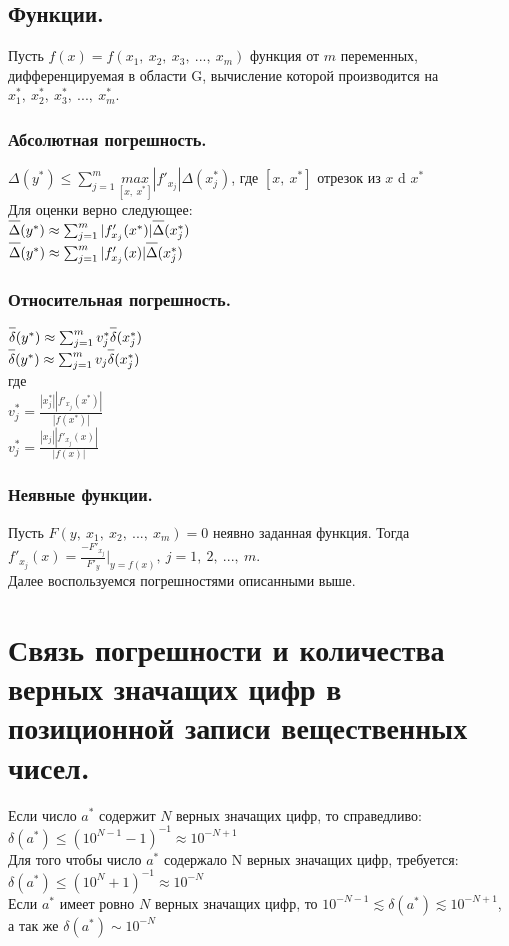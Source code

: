 \documentclass[16pt]{article}
\begin{document}
			\subsection {Функции.}
				Пусть $f(x) = f(x_1,\ x_2,\ x_3,\ ...,\ x_m)$ функция от $m$ переменных, дифференцируемая в области G, вычисление которой производится на $x^{*}_1,\ x^{*}_2,\ x^{*}_3,\ ...,\ x^{*}_m$.\\
				\subsubsection{Абсолютная погрешность.}
				$\Delta(y^{*}) \leq \sum_{j=1}^{m} \underset{[x,\ x^{*}]}{max}|f'_{x_j}|\Delta(x^{*}_j)$, где $[x,\ x^{*}]$ отрезок из $x$ d $x^{*}$\\
				Для оценки верно следующее:\\
				$\overline{\raisebox{3mm}{} \Delta}(y^{*})\approx \sum_{j=1}^{m} |f'_{x_j}(x^{*})|\overline{\raisebox{3mm}{} \Delta}(x^{*}_j)$\\
				$\overline{\raisebox{3mm}{} \Delta}(y^{*})\approx \sum_{j=1}^{m} |f'_{x_j}(x)|\overline{\raisebox{3mm}{} \Delta}(x^{*}_j)$\\
				\subsubsection{Относительная погрешность.}
				$\overline{\raisebox{3mm}{} \delta}(y^{*}) \approx \sum_{j=1}^{m} v^{*}_j \overline{\raisebox{3mm}{} \delta}(x^{*}_j)$\\
				$\overline{\raisebox{3mm}{} \delta}(y^{*}) \approx \sum_{j=1}^{m} v_j \overline{\raisebox{3mm}{} \delta}(x^{*}_j)$\\
				где\\
				$v^{*}_j = \frac{|x^{*}_j||f'_{x_j}(x^{*})|}{|f(x^{*})|}$\\
				$v^{*}_j = \frac{|x_j||f'_{x_j}(x)|}{|f(x)|}$\\
				\subsubsection{Неявные функции.}
				Пусть $F(y,\ x_1,\ x_2,\ ...,\ x_m) = 0 $ неявно заданная функция. Тогда $f'_{x_j}(x) = \frac{-F'_{x_j}}{F'_y}|_{y=f(x)},\ j=1,\ 2,\ ...,\ m.$\\
				Далее воспользуемся погрешностями описанными выше.\\ 
		\section {Связь погрешности и количества верных значащих цифр в позиционной записи вещественных чисел.}
			Если число $a^{*}$ содержит $N$ верных значащих цифр, то справедливо:\\
			$\delta(a^{*}) \leq (10^{N-1} - 1)^{-1} \approx 10^{-N+1}$\\
			Для того чтобы число $a^{*}$ содержало N верных значащих цифр, требуется:\\
			$\delta(a^{*}) \leq (10^{N} + 1)^{-1} \approx 10^{-N}$\\
			Если $a^{*}$ имеет ровно $N$ верных значащих цифр, то $10^{-N-1} \lesssim \delta(a^{*}) \lesssim 10^{-N+1}$, а так же $\delta(a^{*}) \sim 10^{-N}$ 
\end{document}
